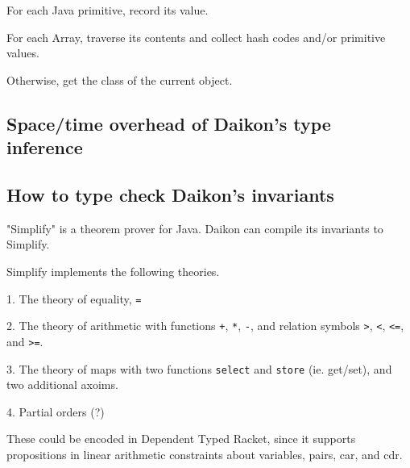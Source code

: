 \documentclass[10pt]{article}
\begin{document}
For each Java primitive, record its value.

For each Array, traverse its contents and collect hash codes
and/or primitive values.

Otherwise, get the class of the current object.

\subsection*{Space/time overhead of Daikon's type inference}

\subsection*{How to type check Daikon's invariants}

"Simplify" is a theorem prover for Java. Daikon can compile its invariants
to Simplify.

Simplify implements the following theories.

1. The theory of equality, \texttt{=}

2. The theory of arithmetic with functions \texttt{+}, \texttt{*}, \texttt{-},
	 and relation symbols \texttt{>}, \texttt{<}, \texttt{<=}, and \texttt{>=}.

3. The theory of maps with two functions \texttt{select} and \texttt{store} (ie. get/set),
	 and two additional axoims.

4. Partial orders (?)

These could be encoded in Dependent Typed Racket, since it supports propositions
in linear arithmetic constraints about variables, pairs, car, and cdr.

\end{document}
